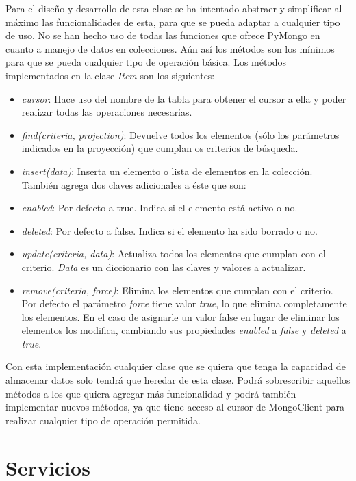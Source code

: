 \bigskip
Para el diseño y desarrollo de esta clase se ha intentado abstraer y simplificar al máximo las funcionalidades de esta, para que se pueda adaptar a cualquier tipo de uso. No se han hecho uso de todas las funciones que ofrece PyMongo en cuanto a manejo de datos en colecciones. Aún así los métodos son los mínimos para que se pueda cualquier tipo de operación básica. Los métodos implementados en la clase \textit{Item} son los siguientes:
\begin{itemize}
	\item \textit{cursor}: Hace uso del nombre de la tabla para obtener el cursor a ella y poder realizar todas las operaciones necesarias.
	\item \textit{find(criteria, projection)}: Devuelve todos los elementos (sólo los parámetros indicados en la proyección) que cumplan os criterios de búsqueda.
	\item \textit{insert(data)}: Inserta un elemento o lista de elementos en la colección. También agrega dos claves adicionales a éste que son:
	\item \textit{enabled}: Por defecto a true. Indica si el elemento está activo o no.
	\item \textit{deleted}: Por defecto a false. Indica si el elemento ha sido borrado o no.
	\item \textit{update(criteria, data)}: Actualiza todos los elementos que cumplan con el criterio. \textit{Data} es un diccionario con las claves y valores a actualizar.
	\item \textit{remove(criteria, force)}: Elimina los elementos que cumplan con el criterio. Por defecto el parámetro \textit{force} tiene valor \textit{true}, lo que elimina completamente los elementos. En el caso de asignarle un valor false en lugar de eliminar los elementos los modifica, cambiando sus propiedades \textit{enabled} a \textit{false} y \textit{deleted} a \textit{true}.
\end{itemize}



\bigskip
Con esta implementación cualquier clase que se quiera que tenga la capacidad de almacenar datos solo tendrá que heredar de esta clase. Podrá sobrescribir aquellos métodos a los que quiera agregar más funcionalidad y podrá también implementar nuevos métodos, ya que tiene acceso al cursor de MongoClient para realizar cualquier tipo de operación permitida.




\section{Servicios}


